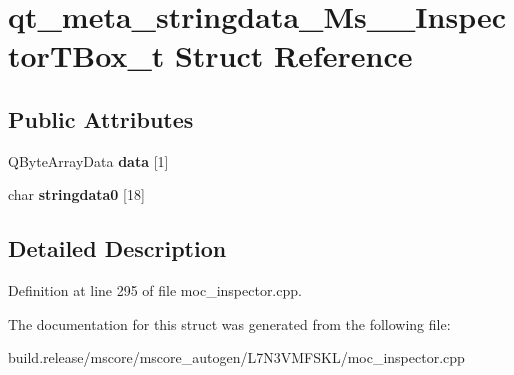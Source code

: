 \hypertarget{structqt__meta__stringdata___ms_____inspector_t_box__t}{}\section{qt\+\_\+meta\+\_\+stringdata\+\_\+\+Ms\+\_\+\+\_\+\+Inspector\+T\+Box\+\_\+t Struct Reference}
\label{structqt__meta__stringdata___ms_____inspector_t_box__t}
\subsection*{Public Attributes}
\begin{DoxyCompactItemize}
\item 
\mbox{\label{structqt__meta__stringdata___ms_____inspector_t_box__t_ac13d3e4e4192912825b96521f4b53c79}} 
Q\+Byte\+Array\+Data {\bfseries data} \mbox{[}1\mbox{]}
\item 
\mbox{\label{structqt__meta__stringdata___ms_____inspector_t_box__t_aff45c7743eb4271a5f47eb9d98abe26b}} 
char {\bfseries stringdata0} \mbox{[}18\mbox{]}
\end{DoxyCompactItemize}


\subsection{Detailed Description}


Definition at line 295 of file moc\+\_\+inspector.\+cpp.



The documentation for this struct was generated from the following file\+:\begin{DoxyCompactItemize}
\item 
build.\+release/mscore/mscore\+\_\+autogen/\+L7\+N3\+V\+M\+F\+S\+K\+L/moc\+\_\+inspector.\+cpp\end{DoxyCompactItemize}
